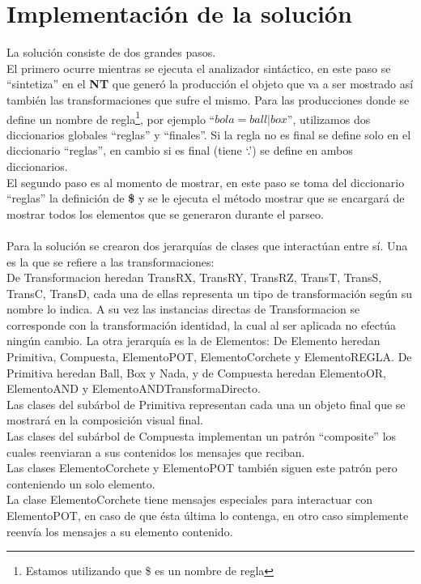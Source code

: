 \documentclass[10pt,a4paper]{article}
\begin{document}
\section{Implementación de la solución}
La solución consiste de dos grandes pasos.\\
El primero ocurre mientras se ejecuta el analizador sintáctico, en este paso se ``sintetiza'' en el \textbf{NT} que generó la producción el objeto que va a ser mostrado así también las transformaciones que sufre el mismo.
Para las producciones donde se define un nombre de regla\footnote{Estamos utilizando que \$ es un nombre de regla}, por ejemplo ``$bola=ball|box$'', utilizamos dos diccionarios globales ``reglas'' y ``finales''. Si la regla no es final se define solo en el diccionario ``reglas'', en cambio si es final (tiene `.') se define en ambos diccionarios.\\
El segundo paso es al momento de mostrar, en este paso se toma del diccionario ``reglas'' la definición de \textbf{\$} y se le ejecuta el método mostrar que se encargará de mostrar todos los elementos que se generaron durante el parseo.\\
\\
Para la solución se crearon dos jerarquías de clases que interactúan entre sí. Una es la que se refiere a las transformaciones:\\
De Transformacion heredan TransRX, TransRY, TransRZ, TransT, TransS, TransC, TransD, cada una de ellas representa un tipo de transformación según su nombre lo indica. A su vez las instancias directas de Transformacion se corresponde con la transformación identidad, la cual al ser aplicada no efectúa ningún cambio.
La otra jerarquía es la de Elementos:
De Elemento heredan Primitiva, Compuesta, ElementoPOT, ElementoCorchete y ElementoREGLA. De Primitiva heredan Ball, Box y Nada, y de Compuesta heredan ElementoOR, ElementoAND y  ElementoANDTransformaDirecto.\\
Las clases del subárbol de Primitiva representan cada una un objeto final que se mostrará en la composición visual final.\\
Las clases del subárbol de Compuesta implementan un patrón ``composite'' los cuales reenviaran a sus contenidos los mensajes que reciban.\\
Las clases ElementoCorchete y ElementoPOT también siguen este patrón pero conteniendo un solo elemento.\\
La clase ElementoCorchete tiene mensajes especiales para interactuar con ElementoPOT, en caso de que ésta última lo contenga, en otro caso simplemente reenvía los mensajes a su elemento contenido.\\
\end{document}

